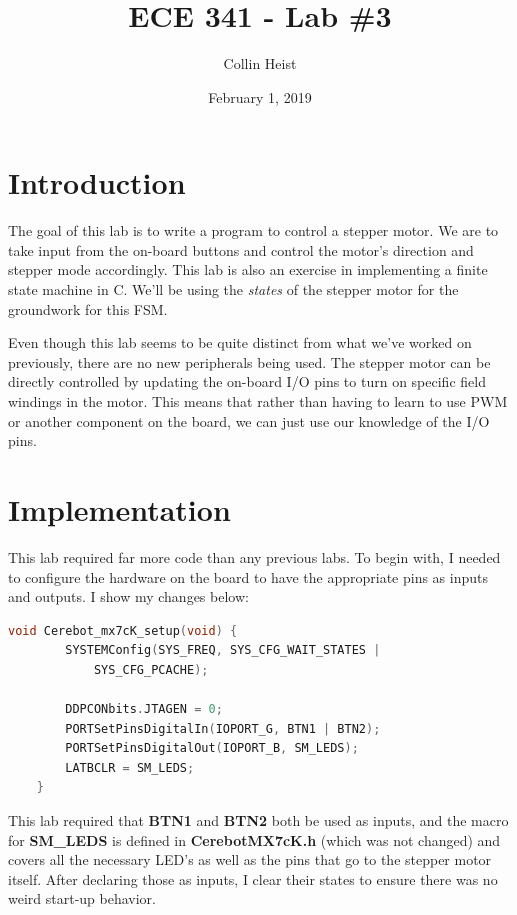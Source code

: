 \documentclass[a4paper, 12pt]{article}
\begin{document}
\title{ECE 341 - Lab \#3}
\author{Collin Heist}
\date{February 1, 2019}
\maketitle
{}
\tableofcontents
\lstlistoflistings
\newpage
{}

\section{Introduction}
The goal of this lab is to write a program to control a stepper motor. We are to take input from the on-board buttons and control the motor's direction and stepper mode accordingly. This lab is also an exercise in implementing a finite state machine in C. We'll be using the \textit{states} of the stepper motor for the groundwork for this FSM.

Even though this lab seems to be quite distinct from what we've worked on previously, there are no new peripherals being used. The stepper motor can be directly controlled by updating the on-board I/O pins to turn on specific field windings in the motor. This means that rather than having to learn to use PWM or another component on the board, we can just use our knowledge of the I/O pins.

\section{Implementation}
This lab required far more code than any previous labs. To begin with, I needed to configure the hardware on the board to have the appropriate pins as inputs and outputs. I show my changes below:

	\begin{mdframed}[backgroundcolor=code-gray, roundcorner=10pt,
								innerleftmargin=5, innertopmargin=5, innerbottommargin=5]	
	\begin{lstlisting}[language=C, caption=Cerebot Implementation File, tabsize=2]
	void Cerebot_mx7cK_setup(void) {
		SYSTEMConfig(SYS_FREQ, SYS_CFG_WAIT_STATES |
			SYS_CFG_PCACHE);

		DDPCONbits.JTAGEN = 0;
		PORTSetPinsDigitalIn(IOPORT_G, BTN1 | BTN2);
		PORTSetPinsDigitalOut(IOPORT_B, SM_LEDS);
		LATBCLR = SM_LEDS;
	}
	\end{lstlisting}
	\end{mdframed}
	
This lab required that \textbf{BTN1} and \textbf{BTN2} both be used as inputs, and the macro for \textbf{SM\_LEDS} is defined in \textbf{CerebotMX7cK.h} (which was not changed) and covers all the necessary LED's as well as the pins that go to the stepper motor itself. After declaring those as inputs, I clear their states to ensure there was no weird start-up behavior.
\end{document}
